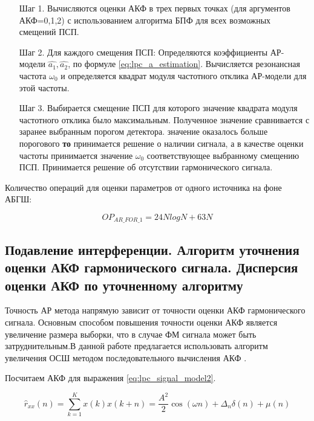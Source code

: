 \begin{itemize}
\item[Шаг 1.] Вычисляются оценки  АКФ в трех первых точках (для аргументов АКФ=0,1,2)
	с использованием алгоритма БПФ для всех возможных смещений ПСП. 
\item[Шаг 2.] Для каждого смещения ПСП: 
	Определяются коэффициенты АР-модели ${\hat{a_1}, \hat{a_2}}$, 
	по формуле \ref{eq:lpc_a_estimation}. 
	Вычисляется резонансная частота ${\omega_0}$
	и определяется квадрат модуля частотного отклика АР-модели для этой частоты. 
\item[Шаг 3.] Выбирается смещение ПСП для которого значение квадрата модуля частотного отклика было максимальным. Полученное значение сравнивается с заранее выбранным порогом детектора. 
	  значение оказалось больше порогового {\bf{то}} 
		принимается решение о наличии сигнала, а в качестве оценки
		частоты принимается значение ${\omega_0}$ соответствующее выбранному смещению ПСП. 
		Принимается решение об отсутствии гармонического сигнала.
\end{itemize}

Количество операций для оценки параметров от одного источника на фоне АБГШ:
\begin{center}
\begin{equation}
	OP_{AR\_FOR\_1} = 24NlogN + 63N
\end{equation}
\end{center}

\subsection{Подавление интерференции. Алгоритм уточнения оценки АКФ гармонического сигнала.
		Дисперсия оценки АКФ по уточненному алгоритму}
\label{l:ssec3_quadruple}

Точность АР метода напрямую зависит от точности оценки АКФ гармонического сигнала. Основным способом повышения точности оценки АКФ является увеличение размера выборки,
что в случае ФМ сигнала может быть затруднительным.В данной работе предлагается использовать алгоритм увеличения ОСШ методом последовательного вычисления
АКФ \cite{ostanin_akf}.

Посчитаем АКФ для выражения \ref{eq:lpc_signal_model2}.

\begin{center}
\begin{equation}
	\label{eq:lpc_akf_n}
	\hat{r}_{xx}(n) = \sum \limits_{k=1}^{K} x(k)x(k+n) = \frac{A^2}{2} \cos{(\omega{n})} + \Delta_n \delta{(n)} + \mu{(n)}
\end{equation}
\end{center}

